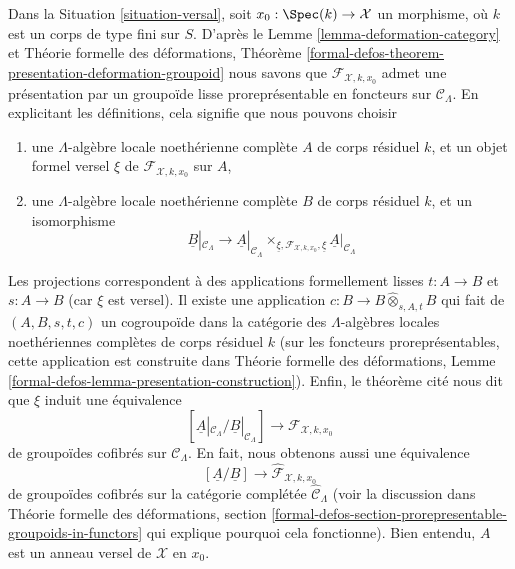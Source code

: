 \begin{remark}
\label{remark-groupoid-defo}
Dans la Situation \ref{situation-versal}, soit $x_0 : \Spec(k) \to \mathcal{X}$
un morphisme, où $k$ est un corps de type fini sur $S$.
D'après le Lemme \ref{lemma-deformation-category} et
Théorie formelle des déformations, Théorème
\ref{formal-defos-theorem-presentation-deformation-groupoid}
nous savons que $\mathcal{F}_{\mathcal{X}, k, x_0}$ admet une
présentation par un groupoïde lisse proreprésentable en
foncteurs sur $\mathcal{C}_\Lambda$.
En explicitant les définitions, cela signifie que nous pouvons choisir
\begin{enumerate}
\item une $\Lambda$-algèbre locale noethérienne complète $A$
de corps résiduel $k$, et un objet formel versel $\xi$
de $\mathcal{F}_{\mathcal{X}, k, x_0}$ sur $A$,
\item une $\Lambda$-algèbre locale noethérienne complète $B$
de corps résiduel $k$, et un isomorphisme
$$
\underline{B}|_{\mathcal{C}_\Lambda}
\longrightarrow
\underline{A}|_{\mathcal{C}_\Lambda}
\times_{\underline{\xi}, \mathcal{F}_{\mathcal{X}, k, x_0}, \underline{\xi}}
\underline{A}|_{\mathcal{C}_\Lambda}
$$
\end{enumerate}
Les projections correspondent à des applications formellement lisses
$t : A \to B$ et $s : A \to B$ (car $\xi$ est versel).
Il existe une application $c : B \to B \widehat{\otimes}_{s, A, t} B$
qui fait de $(A, B, s, t, c)$ un cogroupoïde dans la catégorie
des $\Lambda$-algèbres locales noethériennes complètes de corps résiduel $k$
(sur les foncteurs proreprésentables, cette application est construite dans
Théorie formelle des déformations, Lemme
\ref{formal-defos-lemma-presentation-construction}).
Enfin, le théorème cité nous dit que $\xi$ induit
une équivalence
$$
[\underline{A}|_{\mathcal{C}_\Lambda} / \underline{B}|_{\mathcal{C}_\Lambda}]
\longrightarrow
\mathcal{F}_{\mathcal{X}, k, x_0}
$$
de groupoïdes cofibrés sur $\mathcal{C}_\Lambda$. En fait, nous obtenons aussi
une équivalence
$$
[\underline{A}/\underline{B}]
\longrightarrow
\widehat{\mathcal{F}}_{\mathcal{X}, k, x_0}
$$
de groupoïdes cofibrés sur la catégorie complétée
$\widehat{\mathcal{C}}_\Lambda$ (voir la discussion dans
Théorie formelle des déformations, section
\ref{formal-defos-section-prorepresentable-groupoids-in-functors}
qui explique pourquoi cela fonctionne). Bien entendu, $A$ est un anneau versel de
$\mathcal{X}$ en $x_0$.
\end{remark}








